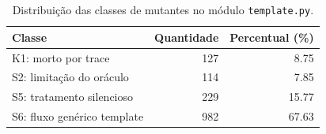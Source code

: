 \begin{table}[htbp]
\centering
\caption{Distribuição das classes de mutantes no módulo \texttt{template.py}.}
\label{tab:classes_mutantes_template}
\begin{tabular}{lrr}
\hline
\textbf{Classe} & \textbf{Quantidade} & \textbf{Percentual (\%)} \\
\hline
K1: morto por trace & 127 & 8.75 \\
S2: limitação do oráculo & 114 & 7.85 \\
S5: tratamento silencioso & 229 & 15.77 \\
S6: fluxo genérico template & 982 & 67.63 \\
\hline
\end{tabular}
\end{table}
